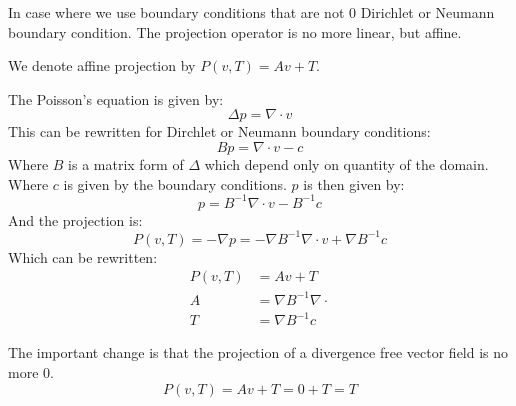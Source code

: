   In case where we use boundary conditions that are not 0 Dirichlet or Neumann boundary condition.
  The projection operator is no more linear, but affine.

  \begin{definition}
  We denote affine projection by $P(v,T)=Av+T$.
  
  The Poisson's equation is given by:
  \begin{equation}
   \Delta p=\nabla \cdot v
  \end{equation}
This can be rewritten for Dirchlet or Neumann boundary conditions:
\begin{equation}
 B p=\nabla \cdot v-c
\end{equation}
Where $B$ is a matrix form of $\Delta$ which depend only on quantity of the domain.
Where $c$ is given by the boundary conditions.
$p$ is then given by:
\begin{equation}
 p=B^{-1} \nabla \cdot v-B^{-1}c
\end{equation}
And the projection is:
\begin{equation}
 P(v,T)=-\nabla p=-\nabla B^{-1}\nabla \cdot v+\nabla B^{-1}c
\end{equation}
Which can be rewritten:
\begin{align}
P(v,T)&=Av+T\\
A&=\nabla B^{-1}\nabla \cdot\\
T&=\nabla B^{-1}c
\end{align}
  
  \end{definition}
  
  The important change is that the projection of a divergence free vector field is no more 0.
  \begin{equation}
  P(v,T)=Av+T=0+T=T
  \end{equation}




